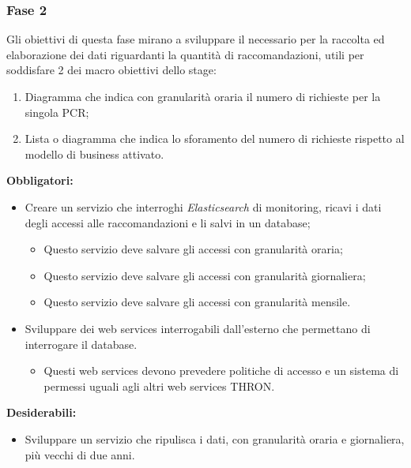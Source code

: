 \documentclass[a4paper, 12pt, twoside, openright]{book}
\begin{document}
\subsubsection{Fase 2}
Gli obiettivi di questa fase mirano a sviluppare il necessario per la raccolta ed elaborazione dei dati riguardanti la quantità di raccomandazioni, utili per soddisfare 2 dei macro obiettivi dello stage:
\begin{enumerate}
	\item Diagramma che indica con granularità oraria il numero di richieste per la singola PCR;
	\item Lista o diagramma che indica lo sforamento del numero di richieste rispetto al modello di business attivato.
\end{enumerate}
\textbf{Obbligatori:}
\begin{itemize}
	\item Creare un servizio che interroghi \textit{Elasticsearch} di monitoring, ricavi i dati degli accessi alle raccomandazioni e li salvi in un database;
	\begin{itemize}
		\item Questo servizio deve salvare gli accessi con granularità oraria;
		\item Questo servizio deve salvare gli accessi con granularità giornaliera;
		\item Questo servizio deve salvare gli accessi con granularità mensile.
	\end{itemize}
	\item Sviluppare dei web services interrogabili dall'esterno che permettano di interrogare il database.
	\begin{itemize}
		\item Questi web services devono prevedere politiche di accesso e un sistema di permessi uguali agli altri web services THRON.
	\end{itemize}
\end{itemize}
\textbf{Desiderabili:}
\begin{itemize}
	\item Sviluppare un servizio che ripulisca i dati, con granularità oraria e giornaliera, più vecchi di due anni.
\end{itemize}
\end{document}
